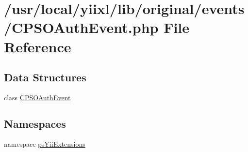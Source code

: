 \hypertarget{CPSOAuthEvent_8php}{
\section{/usr/local/yiixl/lib/original/events/CPSOAuthEvent.php File Reference}
\label{CPSOAuthEvent_8php}
}
\subsection*{Data Structures}
\begin{DoxyCompactItemize}
\item 
class \hyperlink{classCPSOAuthEvent}{CPSOAuthEvent}
\end{DoxyCompactItemize}
\subsection*{Namespaces}
\begin{DoxyCompactItemize}
\item 
namespace \hyperlink{namespacepsYiiExtensions}{psYiiExtensions}
\end{DoxyCompactItemize}
